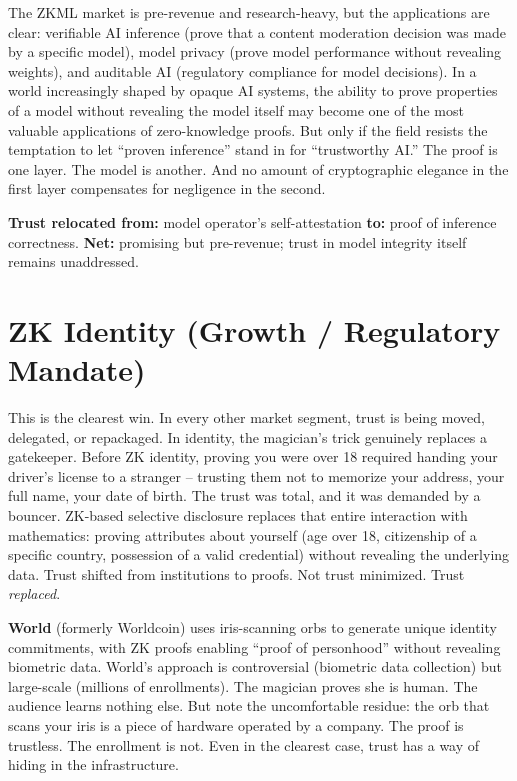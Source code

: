\documentclass[
  11pt,
  openany]{report}
\renewcommand{\textbf}[1]{{\bfseries\color{MidnightBold}#1}}
\begin{document}
The ZKML market is pre-revenue and research-heavy, but the applications are
clear: verifiable AI inference (prove that a content moderation decision was
made by a specific model), model privacy (prove model performance without
revealing weights), and auditable AI (regulatory compliance for model
decisions). In a world increasingly shaped by opaque AI systems, the ability to
prove properties of a model without revealing the model itself may become one of
the most valuable applications of zero-knowledge proofs. But only if the field
resists the temptation to let ``proven inference'' stand in for ``trustworthy
AI.'' The proof is one layer. The model is another. And no amount of
cryptographic elegance in the first layer compensates for negligence in the
second.

\textbf{Trust relocated from:} model operator's self-attestation \textbf{to:}
proof of inference correctness. \textbf{Net:} promising but pre-revenue; trust
in model integrity itself remains unaddressed.

\section{ZK Identity (Growth / Regulatory
Mandate)}\label{zk-identity-growth-regulatory-mandate}

This is the clearest win. In every other market segment, trust is being moved,
delegated, or repackaged. In identity, the magician's trick genuinely replaces a
gatekeeper. Before ZK identity, proving you were over 18 required handing your
driver's license to a stranger -- trusting them not to memorize your address,
your full name, your date of birth. The trust was total, and it was demanded by
a bouncer. ZK-based selective disclosure replaces that entire interaction with
mathematics: proving attributes about yourself (age over 18, citizenship of a
specific country, possession of a valid credential) without revealing the
underlying data. Trust shifted from institutions to proofs. Not trust minimized.
Trust \emph{replaced}.

\textbf{World} (formerly Worldcoin) uses iris-scanning orbs to generate unique
identity commitments, with ZK proofs enabling ``proof of personhood'' without
revealing biometric data. World's approach is controversial (biometric data
collection) but large-scale (millions of enrollments). The magician proves she
is human. The audience learns nothing else. But note the uncomfortable residue:
the orb that scans your iris is a piece of hardware operated by a company. The
proof is trustless. The enrollment is not. Even in the clearest case, trust has
a way of hiding in the infrastructure.
\end{document}
